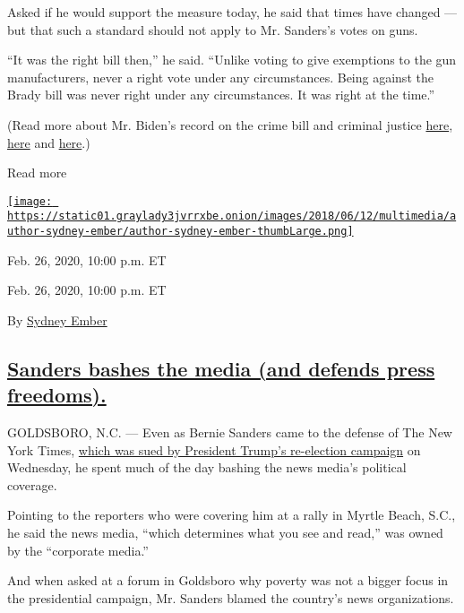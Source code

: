 Asked if he would support the measure today, he said that times have
changed --- but that such a standard should not apply to Mr. Sanders's
votes on guns.

``It was the right bill then,'' he said. ``Unlike voting to give
exemptions to the gun manufacturers, never a right vote under any
circumstances. Being against the Brady bill was never right under any
circumstances. It was right at the time.''

(Read more about Mr. Biden's record on the crime bill and criminal
justice
\href{https://www.nytimes3xbfgragh.onion/2019/06/25/us/joe-biden-crime-laws.html}{here},
\href{https://www.nytimes3xbfgragh.onion/2019/06/27/us/politics/joe-biden-crime-bill-mass-incarceration.html}{here}
and
\href{https://www.nytimes3xbfgragh.onion/2019/07/23/us/politics/biden-criminal-justice.html}{here}.)

Read more

\href{https://www.nytimes3xbfgragh.onion/by/sydney-ember}{\texttt{[image: https://static01.graylady3jvrrxbe.onion/images/2018/06/12/multimedia/author-sydney-ember/author-sydney-ember-thumbLarge.png]}}

Feb. 26, 2020, 10:00 p.m. ET

Feb. 26, 2020, 10:00 p.m. ET

By \href{https://www.nytimes3xbfgragh.onion/by/sydney-ember}{Sydney
Ember}

\hypertarget{sanders-bashes-the-media-and-defends-press-freedoms}{%
\subsection{\texorpdfstring{\protect\hyperlink{bernie-sanders-media}{Sanders
bashes the media (and defends press
freedoms).}}{Sanders bashes the media (and defends press freedoms).}}\label{sanders-bashes-the-media-and-defends-press-freedoms}}

GOLDSBORO, N.C. --- Even as Bernie Sanders came to the defense of The
New York Times,
\href{https://www.nytimes3xbfgragh.onion/2020/02/26/business/media/trump-new-york-times-lawsuit.html}{which
was sued by President Trump's re-election campaign} on Wednesday, he
spent much of the day bashing the news media's political coverage.

Pointing to the reporters who were covering him at a rally in Myrtle
Beach, S.C., he said the news media, ``which determines what you see and
read,'' was owned by the ``corporate media.''

And when asked at a forum in Goldsboro why poverty was not a bigger
focus in the presidential campaign, Mr. Sanders blamed the country's
news organizations.

